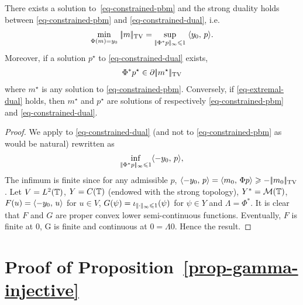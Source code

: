\begin{prop}
There exists a solution to~\eqref{eq-constrained-pbm} and the strong duality holds between
 \eqref{eq-constrained-pbm} and \eqref{eq-constrained-dual}, i.e. 
\begin{align}
	\underset{\Phi(m)=y_0}{\min}\; |\!| m |\!|_{\text{\upshape TV}} =	\underset{|\!| \Phi^* p |\!|_{\infty}\leqslant 1}{\sup}\; \langle y_0,\,p\rangle.
\end{align}
Moreover, if a solution $p^\star$ to \eqref{eq-constrained-dual} exists, 
\begin{align}
	\Phi^* p^\star \in \partial{|\!| m^\star |\!|_{\text{\upshape TV}}}
\label{eq-extremal-dual}
\end{align}
where $m^\star$ is any solution to \eqref{eq-constrained-pbm}.
Conversely, if \eqref{eq-extremal-dual} holds, then $m^\star$ and $p^\star$ are solutions
of respectively \eqref{eq-constrained-pbm} and \eqref{eq-constrained-dual}.
\label{prop-strong-dual}
\end{prop}

\begin{proof}
We apply \cite[Theorem~II.4.1]{ekeland1976convex} to \eqref{eq-constrained-dual} (and not to \eqref{eq-constrained-pbm} as would be natural)
rewritten as
\begin{align*}
\inf_{|\!| \Phi^* p |\!|_{\infty} \leqslant 1} \langle -y_0,\,p\rangle,
\end{align*}
The infimum is finite since for any admissible $p$, $\langle -y_0,\,p\rangle=\langle m_0,\,\Phi p\rangle \geqslant - |\!| m_0 |\!|_{\text{\upshape TV}}$.
Let $V=L^2(\mathbb{T})$, $Y=C(\mathbb{T})$ (endowed with the strong topology), $Y^*=\mathcal{M}(\mathbb{T})$, $F(u)=\langle -y_0,\,u\rangle$ for $u\in V$,
 $G(\psi)=\iota_{|\!| \cdot |\!|_{\infty}\leqslant 1}(\psi)$ for $\psi \in Y$ and $\Lambda=\Phi^*$. It is clear that $F$ and $G$ are proper convex lower semi-continuous functions. Eventually, $F$ is finite at $0$, G is finite and continuous at $0=\Lambda 0$.
Hence the result.
\end{proof}

\section{Proof of Proposition~\ref{prop-gamma-injective}}
\label{sec-proof1}

